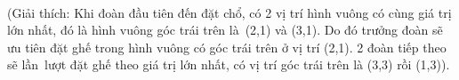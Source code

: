 \\   (Giải thích: Khi đoàn đầu tiên đến đặt chổ, có 2 vị trí hình vuông có cùng giá trị lớn nhất, đó là hình vuông góc trái trên là (2,1) và (3,1). Do đó trưởng đoàn sẽ ưu tiên đặt ghế trong hình vuông có góc trái trên ở vị trí (2,1). 2 đoàn tiếp theo sẽ lần lượt đặt ghế theo giá trị lớn nhất, có vị trí góc trái trên là (3,3) rồi (1,3)).  

